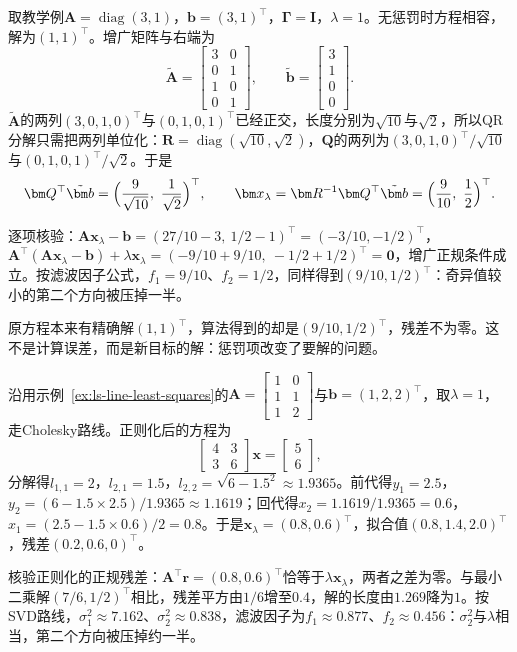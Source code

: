 \begin{example}[增广QR求岭回归]
\label{ex:ls-ridge-augmented-qr}
取教学例$\bm A=\operatorname{diag}(3,1)$，$\bm b=(3,1)^\top$，$\bm\Gamma=\bm I$，$\lambda=1$。无惩罚时方程相容，解为$(1,1)^\top$。增广矩阵与右端为
\[
\tilde{\bm A}=\begin{bmatrix}3&0\\0&1\\1&0\\0&1\end{bmatrix},\qquad
\tilde{\bm b}=\begin{bmatrix}3\\1\\0\\0\end{bmatrix}.
\]
$\tilde{\bm A}$的两列$(3,0,1,0)^\top$与$(0,1,0,1)^\top$已经正交，长度分别为$\sqrt{10}$与$\sqrt2$，所以QR分解只需把两列单位化：$\bm R=\operatorname{diag}(\sqrt{10},\sqrt2)$，$\bm Q$的两列为$(3,0,1,0)^\top/\sqrt{10}$与$(0,1,0,1)^\top/\sqrt2$。于是
\[
\bm Q^\top\tilde{\bm b}=\Bigl(\frac{9}{\sqrt{10}},\ \frac{1}{\sqrt2}\Bigr)^\top,\qquad
\bm x_\lambda=\bm R^{-1}\bm Q^\top\tilde{\bm b}=\Bigl(\frac{9}{10},\ \frac12\Bigr)^\top .
\]

逐项核验：$\bm A\bm x_\lambda-\bm b=(27/10-3,\ 1/2-1)^\top=(-3/10,-1/2)^\top$，$\bm A^\top(\bm A\bm x_\lambda-\bm b)+\lambda\bm x_\lambda=(-9/10+9/10,\ -1/2+1/2)^\top=\bm0$，增广正规条件成立。按滤波因子公式，$f_1=9/10$、$f_2=1/2$，同样得到$(9/10,1/2)^\top$：奇异值较小的第二个方向被压掉一半。

原方程本来有精确解$(1,1)^\top$，算法得到的却是$(9/10,1/2)^\top$，残差不为零。这不是计算误差，而是新目标的解：惩罚项改变了要解的问题。
\end{example}

\begin{example}[直线拟合的岭回归]
\label{ex:ls-ridge-line-fit}
沿用示例~\ref{ex:ls-line-least-squares}的$\bm A=\left[\begin{smallmatrix}1&0\\1&1\\1&2\end{smallmatrix}\right]$与$\bm b=(1,2,2)^\top$，取$\lambda=1$，走Cholesky路线。正则化后的方程为
\[
 \begin{bmatrix}4&3\\3&6\end{bmatrix}\bm x=\begin{bmatrix}5\\6\end{bmatrix},
\]
分解得$l_{1,1}=2$，$l_{2,1}=1.5$，$l_{2,2}=\sqrt{6-1.5^2}\approx1.9365$。前代得$y_1=2.5$，$y_2=(6-1.5\times2.5)/1.9365\approx1.1619$；回代得$x_2=1.1619/1.9365=0.6$，$x_1=(2.5-1.5\times0.6)/2=0.8$。于是$\bm x_\lambda=(0.8,0.6)^\top$，拟合值$(0.8,1.4,2.0)^\top$，残差$(0.2,0.6,0)^\top$。

核验正则化的正规残差：$\bm A^\top\bm r=(0.8,0.6)^\top$恰等于$\lambda\bm x_\lambda$，两者之差为零。与最小二乘解$(7/6,1/2)^\top$相比，残差平方由$1/6$增至$0.4$，解的长度由$1.269$降为$1$。按SVD路线，$\sigma_1^2\approx7.162$、$\sigma_2^2\approx0.838$，滤波因子为$f_1\approx0.877$、$f_2\approx0.456$：$\sigma_2^2$与$\lambda$相当，第二个方向被压掉约一半。
\end{example}


